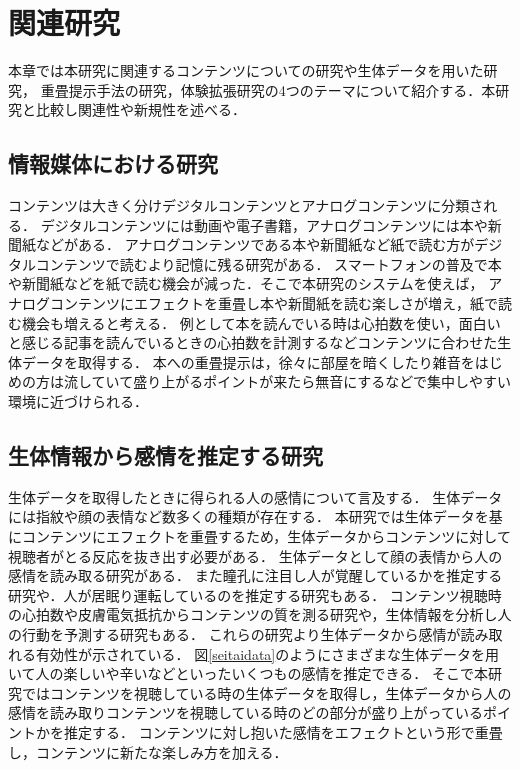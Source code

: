 \thispagestyle{myheadings}
\chapter{関連研究}
本章では本研究に関連するコンテンツについての研究や生体データを用いた研究，
重畳提示手法の研究，体験拡張研究の4つのテーマについて紹介する．本研究と比較し関連性や新規性を述べる．



\section{情報媒体における研究}
コンテンツは大きく分けデジタルコンテンツとアナログコンテンツに分類される．
デジタルコンテンツには動画や電子書籍，アナログコンテンツには本や新聞紙などがある．
アナログコンテンツである本や新聞紙など紙で読む方がデジタルコンテンツで読むより記憶に残る研究がある\cite{books}．
スマートフォンの普及で本や新聞紙などを紙で読む機会が減った．そこで本研究のシステムを使えば，
アナログコンテンツにエフェクトを重畳し本や新聞紙を読む楽しさが増え，紙で読む機会も増えると考える．
例として本を読んでいる時は心拍数を使い，面白いと感じる記事を読んでいるときの心拍数を計測するなどコンテンツに合わせた生体データを取得する．
本への重畳提示は，徐々に部屋を暗くしたり雑音をはじめの方は流していて盛り上がるポイントが来たら無音にするなどで集中しやすい環境に近づけられる．


\section{生体情報から感情を推定する研究}

生体データを取得したときに得られる人の感情について言及する．
生体データには指紋や顔の表情など数多くの種類が存在する．
本研究では生体データを基にコンテンツにエフェクトを重畳するため，生体データからコンテンツに対して視聴者がとる反応を抜き出す必要がある．
生体データとして顔の表情から人の感情を読み取る研究がある\cite{hyoujou,hyoujou2}．
また瞳孔に注目し人が覚醒しているかを推定する研究や．人が居眠り運転しているのを推定する研究もある\cite{doukou}．
コンテンツ視聴時の心拍数や皮膚電気抵抗からコンテンツの質を測る研究\cite{situ}や，生体情報を分析し人の行動を予測する研究\cite{eigo}もある．
これらの研究より生体データから感情が読み取れる有効性が示されている．
図\ref{seitaidata}のようにさまざまな生体データを用いて人の楽しいや辛いなどといったいくつもの感情を推定できる．
そこで本研究ではコンテンツを視聴している時の生体データを取得し，生体データから人の感情を読み取りコンテンツを視聴している時のどの部分が盛り上がっているポイントかを推定する．
コンテンツに対し抱いた感情をエフェクトという形で重畳し，コンテンツに新たな楽しみ方を加える．

